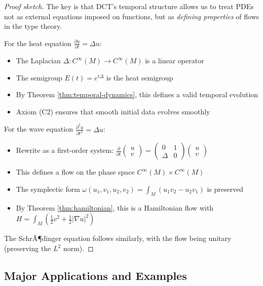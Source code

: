 \documentclass[11pt]{article}
\theoremstyle{definition}
\begin{document}
\begin{proof}[Proof sketch]
The key is that DCT's temporal structure allows us to treat PDEs not as external equations imposed on functions, but as \emph{defining properties} of flows in the type theory.

For the heat equation $\frac{\partial u}{\partial t} = \Delta u$:
\begin{itemize}
\item The Laplacian $\Delta : C^\infty(M) \to C^\infty(M)$ is a linear operator
\item The semigroup $E(t) = e^{t\Delta}$ is the heat semigroup
\item By Theorem \ref{thm:temporal-dynamics}, this defines a valid temporal evolution
\item Axiom (C2) ensures that smooth initial data evolves smoothly
\end{itemize}

For the wave equation $\frac{\partial^2 u}{\partial t^2} = \Delta u$:
\begin{itemize}
\item Rewrite as a first-order system: $\frac{\partial}{\partial t}\begin{pmatrix} u \\ v \end{pmatrix} = \begin{pmatrix} 0 & 1 \\ \Delta & 0 \end{pmatrix} \begin{pmatrix} u \\ v \end{pmatrix}$
\item This defines a flow on the phase space $C^\infty(M) \times C^\infty(M)$
\item The symplectic form $\omega(u_1, v_1, u_2, v_2) = \int_M (u_1 v_2 - u_2 v_1)$ is preserved
\item By Theorem \ref{thm:hamiltonian}, this is a Hamiltonian flow with $H = \int_M (\frac{1}{2}v^2 + \frac{1}{2}|\nabla u|^2)$
\end{itemize}

The SchrÃ¶dinger equation follows similarly, with the flow being unitary (preserving the $L^2$ norm).
\end{proof}

\subsection{Major Applications and Examples}
\end{document}
